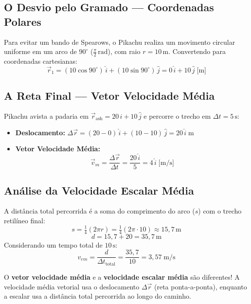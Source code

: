 \documentclass[10.5pt, a4paper]{extarticle}
\begin{document}
\subsection{O Desvio pelo Gramado — Coordenadas Polares}

Para evitar um bando de Spearows, o Pikachu realiza um movimento circular uniforme em um arco de $90^\circ$ ($\frac{\pi}{2}\,\text{rad}$), com raio $r = 10\,\text{m}$. Convertendo para coordenadas cartesianas:
\[
  \vec{r}_1 = (10\cos 90^\circ)\,\hat{i} + (10\sin 90^\circ)\,\hat{j} = 0\,\hat{i} + 10\,\hat{j} \;\text{[m]}
\]

\subsection{A Reta Final — Vetor Velocidade Média}

Pikachu avista a padaria em $\vec{r}_{\text{ash}} = 20\,\hat{i} + 10\,\hat{j}$ e percorre o trecho em $\Delta t = 5\,\text{s}$:
\begin{itemize}[nosep]
  \item \textbf{Deslocamento:} $\Delta\vec{r} = (20-0)\,\hat{i} + (10-10)\,\hat{j} = 20\,\hat{i}\;\text{m}$
  \item \textbf{Vetor Velocidade Média:}
\[
  \vec{v}_m = \frac{\Delta\vec{r}}{\Delta t} = \frac{20\,\hat{i}}{5} = 4\,\hat{i}\;\text{[m/s]}
\]
\end{itemize}

\subsection{Análise da Velocidade Escalar Média}

A distância total percorrida é a soma do comprimento do arco ($s$) com o trecho retilíneo final:
\[
  s = \tfrac{1}{4}(2\pi r) = \tfrac{1}{4}(2\pi \cdot 10) \approx 15{,}7\,\text{m}
\]
\[
  d = 15{,}7 + 20 = 35{,}7\,\text{m}
\]
Considerando um tempo total de $10\,\text{s}$:
\[
  v_{em} = \frac{d}{\Delta t_{\text{total}}} = \frac{35{,}7}{10} = 3{,}57\;\text{m/s}
\]

\begin{bulbabox}
O \textbf{vetor velocidade média} e a \textbf{velocidade escalar média} são diferentes! A velocidade média vetorial usa o deslocamento $\Delta\vec{r}$ (reta ponta-a-ponta), enquanto a escalar usa a distância total percorrida ao longo do caminho.
\end{bulbabox}

\end{document}

